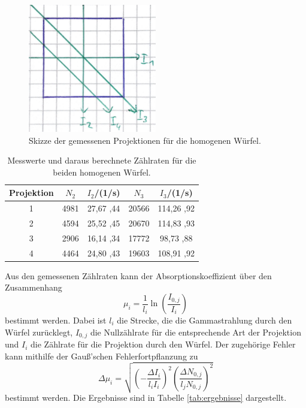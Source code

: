 \begin{figure}
  \centering
  \includegraphics[width=0.5\textwidth]{images/wuerfel2.jpg}
  \caption{Skizze der gemessenen Projektionen für die homogenen Würfel.}
  \label{fig:wuerfel2}
\end{figure}

\begin{table}[htp]
	\begin{center}
    \caption{Messwerte und daraus berechnete Zählraten für die beiden homogenen Würfel.}
    \label{tab:wuerfel2}
		\begin{tabular}{c S[table-format=4.0,table-figures-uncertainty=2] S[table-format=2.2,table-figures-uncertainty=2] S[table-format=5.0,table-figures-uncertainty=3] S[table-format=3.2,table-figures-uncertainty=2]}
		\toprule
			{Projektion} & {$N_2$}  & {$I_2$/(1/s)}  & {$N_3$}  & {$I_3$/(1/s)}\\
			 & 4981  & 27,67 ,44 & 20566  & 114,26 ,92\\
			2 & 4594  & 25,52 ,45 & 20670  & 114,83 ,93\\
			3 & 2906  & 16,14 ,34 & 17772  & 98,73  ,88\\
			4 & 4464  & 24,80 ,43 & 19603  & 108,91 ,92\\
		\bottomrule
		\end{tabular}
	\end{center}
\end{table}

Aus den gemessenen Zählraten kann der Absorptionskoeffizient über den Zusammenhang
\begin{equation}
  \mu_i=\frac{1}{l_i} \ln \left(\frac{I_{0,j}}{I_i} \right)
\end{equation}
bestimmt werden. Dabei ist $l_i$ die Strecke, die die Gammastrahlung durch den Würfel zurücklegt, $I_{0,j}$ die Nullzählrate für die entsprechende Art der Projektion und $I_i$ die Zählrate für die Projektion durch den Würfel. Der zugehörige Fehler kann mithilfe der Gauß'schen Fehlerfortpflanzung zu
\begin{equation}
  \Delta \mu_i=\sqrt{\left(  -\frac{\Delta I_i}{l_i I_i}\right)^2 \left( \frac{\Delta N_{0,j}}{l_j N_{0,j}}\right)^2}
\end{equation}
bestimmt werden. Die Ergebnisse sind in Tabelle \ref{tab:ergebnisse} dargestellt.

